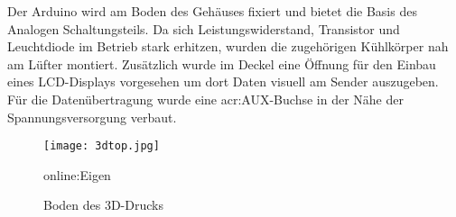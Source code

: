 Der Arduino wird am Boden des Gehäuses fixiert und bietet die Basis des Analogen Schaltungsteils.
Da sich Leistungswiderstand, Transistor und Leuchtdiode im Betrieb stark erhitzen, wurden die zugehörigen Kühlkörper nah am Lüfter montiert. Zusätzlich wurde im Deckel eine Öffnung für den Einbau eines LCD-Displays vorgesehen um dort Daten visuell am Sender auszugeben. Für die Datenübertragung wurde eine \gls{acr:AUX}-Buchse in der Nähe der Spannungsversorgung verbaut.

\begin{figure}[H]
	\centering
	\texttt{[image: 3dtop.jpg]}
	\caption[Boden des 3D-Drucks]{Boden des 3D-Drucks} \gls{online:Eigen}
	\label{fig:3dtop}
\end{figure}





